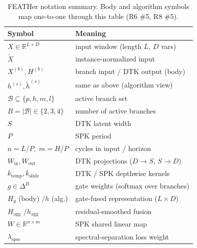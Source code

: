 \documentclass[journal]{IEEEtran}
\theoremstyle{remark}
\begin{document}
\begin{table}[t]
\centering
\caption{FEATHer notation summary. Body and algorithm symbols map
one-to-one through this table (R6 \#5, R8 \#5).}
\label{tab:notation}
\small
\begin{tabular}{ll}
\toprule
Symbol & Meaning \\
\midrule
$X \in \mathbb{R}^{L \times D}$ & input window (length $L$, $D$ vars) \\
$\widetilde X$                  & instance-normalized input \\
$X^{(b)}, H^{(b)}$              & branch input / DTK output (body) \\
$h^{(s)}, \widetilde h^{(s)}$   & same as above (algorithm view) \\
$\mathcal{B} \subseteq \{p,h,m,l\}$ & active branch set \\
$B = |\mathcal{B}| \in \{2,3,4\}$ & number of active branches \\
$S$                              & DTK latent width \\
$P$                              & SPK period \\
$n = L/P,\; m = H/P$             & cycles in input / horizon \\
$W_{\mathrm{in}}, W_{\mathrm{out}}$ & DTK projections ($D{\to}S$, $S{\to}D$) \\
$k_{\mathrm{temp}}, k_{\mathrm{slide}}$ & DTK / SPK depthwise kernels \\
$g \in \Delta^{B}$               & gate weights (softmax over branches) \\
$H_g$ (body) /\;$h$ (alg.)       & gate-fused representation ($L{\times}D$) \\
$H_{\mathrm{agg}}$ /\;$h_{\mathrm{agg}}$ & residual-smoothed fusion \\
$W \in \mathbb{R}^{n \times m}$  & SPK shared linear map \\
$\lambda_{\mathrm{spec}}$        & spectral-separation loss weight \\
\bottomrule
\end{tabular}
\end{table}
\end{document}
